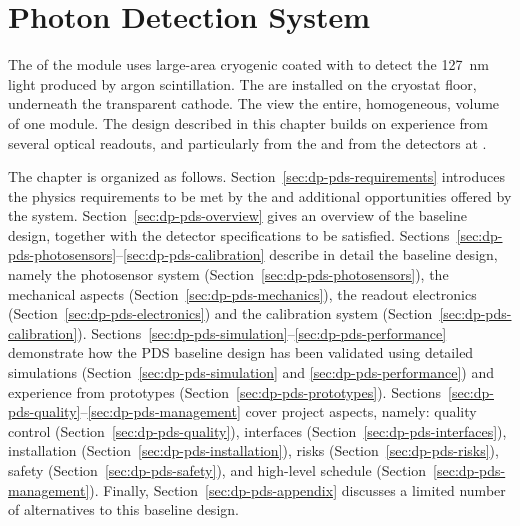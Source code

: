 \chapter{Photon Detection System}
\label{ch:dp-pds}

The  of the \dune \dual module uses large-area cryogenic  coated with  to detect the \SI{127}{\nm} light produced by argon scintillation. The  are installed on the cryostat floor, underneath the  transparent cathode. The   view the entire, homogeneous,  volume of one  module. The design described in this chapter builds on experience from several \lartpc optical readouts, and particularly from the  and from the  detectors at . 

The chapter is organized as follows. Section~\ref{sec:dp-pds-requirements} introduces the physics requirements to be met by the  and additional opportunities offered by the system. Section~\ref{sec:dp-pds-overview} gives an overview of the  baseline design, together with the detector specifications to be satisfied. Sections~\ref{sec:dp-pds-photosensors}--\ref{sec:dp-pds-calibration} describe in detail the  baseline design, namely the  photosensor system (Section~\ref{sec:dp-pds-photosensors}), the mechanical aspects (Section~\ref{sec:dp-pds-mechanics}),  the readout electronics (Section~\ref{sec:dp-pds-electronics}) and the calibration system (Section~\ref{sec:dp-pds-calibration}). Sections~\ref{sec:dp-pds-simulation}--\ref{sec:dp-pds-performance} demonstrate how the PDS baseline design has been validated using detailed simulations (Section~\ref{sec:dp-pds-simulation} and \ref{sec:dp-pds-performance}) and experience from prototypes (Section~\ref{sec:dp-pds-prototypes}). Sections~\ref{sec:dp-pds-quality}--\ref{sec:dp-pds-management} cover  project aspects, namely: quality control (Section~\ref{sec:dp-pds-quality}), interfaces (Section~\ref{sec:dp-pds-interfaces}), installation (Section~\ref{sec:dp-pds-installation}), risks (Section~\ref{sec:dp-pds-risks}), safety (Section~\ref{sec:dp-pds-safety}), and high-level schedule %
(Section~\ref{sec:dp-pds-management}). Finally, Section~\ref{sec:dp-pds-appendix} discusses a limited number of alternatives to this baseline design.  
















